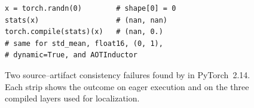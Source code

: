 \begin{figure}[t]
\begin{minipage}[t]{0.485\linewidth}
\begin{lstlisting}
x = torch.randn(0)        # shape[0] = 0
stats(x)                  # (nan, nan)
torch.compile(stats)(x)   # (nan, 0.)
# same for std_mean, float16, (0, 1),
# dynamic=True, and AOTInductor
\end{lstlisting}
\centering
{}
\end{minipage}
\caption{Two source--artifact consistency failures found by \tool in PyTorch~2.14. Each strip shows the outcome
on eager execution and on the three compiled layers used for localization.}
\label{fig:motivation}
\end{figure}

